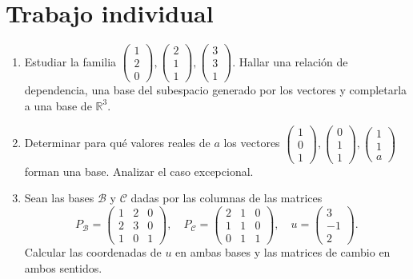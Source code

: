 \documentclass[12pt,a4paper]{article}
\begin{document}
\section{Trabajo individual}
\begin{enumerate}
\item Estudiar la familia $\begin{pmatrix}1\\2\\0\end{pmatrix},\begin{pmatrix}2\\1\\1\end{pmatrix},\begin{pmatrix}3\\3\\1\end{pmatrix}$. Hallar una relación de dependencia, una base del subespacio generado por los vectores y completarla a una base de $\mathbb R^3$.
\item Determinar para qué valores reales de $a$ los vectores $\begin{pmatrix}1\\0\\1\end{pmatrix},\begin{pmatrix}0\\1\\1\end{pmatrix},\begin{pmatrix}1\\1\\a\end{pmatrix}$ forman una base. Analizar el caso excepcional.
\item Sean las bases $\mathcal B$ y $\mathcal C$ dadas por las columnas de las matrices
\[P_{\mathcal B}=\begin{pmatrix}1&2&0\\2&3&0\\1&0&1\end{pmatrix},\quad P_{\mathcal C}=\begin{pmatrix}2&1&0\\1&1&0\\0&1&1\end{pmatrix},\quad u=\begin{pmatrix}3\\-1\\2\end{pmatrix}.\]
Calcular las coordenadas de $u$ en ambas bases y las matrices de cambio en ambos sentidos.

\end{enumerate}
\end{document}
